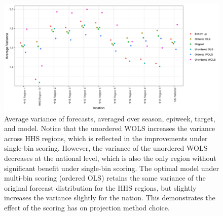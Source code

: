 \documentclass{umassthesis}          %
\begin{document}
   \begin{figure}
   \centering
    \includegraphics[scale=.15]{var.png}
    \caption{Average variance of forecasts, averaged over season, epiweek, target, and model. Notice that the unordered WOLS increases the variance across HHS regions, which is reflected in the improvements under single-bin scoring. However, the variance of the unordered WOLS decreases at the national level, which is also the only region without significant benefit under single-bin scoring. The optimal model under multi-bin scoring (ordered OLS) retains the same variance of the original forecast distribution for the HHS regions, but slightly increases the variance slightly for the nation. This demonstrates the effect of the scoring has on projection method choice.  }
    \label{fig:var}
\end{figure}
\end{document}
